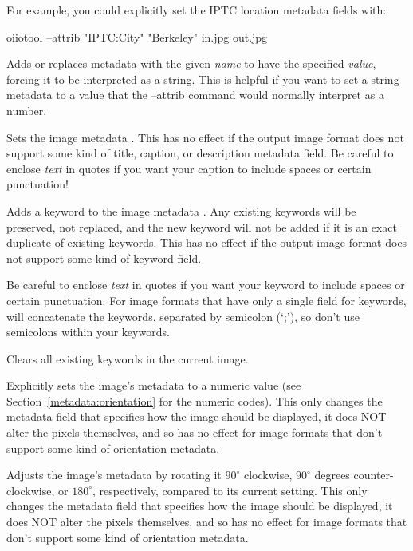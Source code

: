 For example, you could explicitly set the IPTC location metadata fields
with:
\begin{code}
        oiiotool --attrib "IPTC:City" "Berkeley" in.jpg out.jpg
\end{code}
\apiend

Adds or replaces metadata with the given \emph{name} to have the 
specified \emph{value}, forcing it to be interpreted as a {\cf string}.
This is helpful if you want to set a {\cf string} metadata to a value
that the {\cf --attrib} command would normally interpret as a number.
\apiend

Sets the image metadata .
This has no effect if the output image format does not support some kind
of title, caption, or description metadata field.
Be careful to enclose \emph{text} in quotes if you want your caption to
include spaces or certain punctuation!
\apiend

Adds a keyword to the image metadata .  Any existing
keywords will be preserved, not replaced, and the new keyword will not
be added if it is an exact duplicate of existing keywords.  This has no
effect if the output image format does not support some kind of keyword
field.  

Be careful to enclose \emph{text} in quotes if you want your keyword to
include spaces or certain punctuation.  For image formats that have only
a single field for keywords, \OpenImageIO will concatenate the keywords,
separated by semicolon (`;'), so don't use semicolons within your
keywords.
\apiend

Clears all existing keywords in the current image.
\apiend

Explicitly sets the image's  metadata to a numeric
value (see Section~\ref{metadata:orientation} for the numeric codes).
This only changes the metadata field that specifies
how the image should be displayed, it does NOT alter the pixels
themselves, and so has no effect for image formats that don't
support some kind of orientation metadata.
\apiend

Adjusts the image's  metadata by rotating it $90^\circ$
clockwise, $90^\circ$ degrees counter-clockwise, or $180^\circ$,
respectively, compared to its current setting.  This only changes the
metadata field that specifies how the image should be displayed, it does
NOT alter the pixels themselves, and so has no effect for image formats
that don't support some kind of orientation metadata.
\apiend

